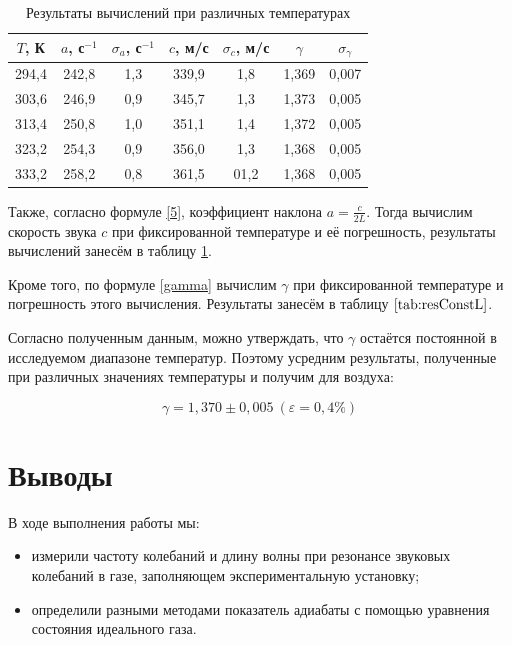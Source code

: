 \documentclass[a4paper,12pt]{article}
\theoremstyle{definition}
\begin{document}
	\begin{table}[H]
		\centering
		\begin{tabular}{|c|c|c|c|c|c|c|}
			\hline
			$ T $, К & $ a $, с$ ^{-1} $ & $ \sigma_a $, с$ ^{-1} $ & $ c $, м/с & $ \sigma_c $, м/с & $ \gamma $ & $ \sigma_\gamma $ \\ \hline
			294,4 & 242,8 & 1,3 & 339,9 & 1,8 & 1,369 & 0,007 \\ \hline
			303,6 & 246,9 & 0,9 & 345,7 & 1,3 & 1,373 & 0,005 \\ \hline
			313,4 & 250,8 & 1,0 & 351,1 & 1,4 & 1,372 & 0,005 \\ \hline
			323,2 & 254,3 & 0,9 & 356,0 & 1,3 & 1,368 & 0,005 \\ \hline
			333,2 & 258,2 & 0,8 & 361,5 & 01,2 & 1,368 & 0,005 \\ \hline
		\end{tabular}
		\caption{Результаты вычислений при различных температурах}
		\label{tab:resConstL}
	\end{table}
	
	Также, согласно формуле \eqref{5}, коэффициент наклона $ \displaystyle a = \frac{c}{2L}$. Тогда вычислим скорость звука $ c $ при фиксированной температуре и её погрешность, результаты вычислений занесём в таблицу \ref{tab:resConstL}.
	
	Кроме того, по формуле \eqref{gamma} вычислим $ \gamma $ при фиксированной температуре и погрешность этого вычисления. Результаты занесём в таблицу $ \ref{tab:resConstL} $. 
	
	Согласно полученным данным, можно утверждать, что $ \gamma $ остаётся постоянной в исследуемом диапазоне температур. Поэтому усредним результаты, полученные при различных значениях температуры и получим для воздуха:
	
	\[ \gamma = 1,370 \pm 0,005 \ (\varepsilon=0,4\%) \]
	
	\section{Выводы}
	
	В ходе выполнения работы мы:
	
	\begin{itemize}
		\item измерили частоту колебаний и длину волны при резонансе звуковых колебаний в газе, заполняющем экспериментальную установку;
		\item определили разными методами показатель адиабаты с помощью уравнения состояния идеального газа.
	\end{itemize}
	
\end{document}
